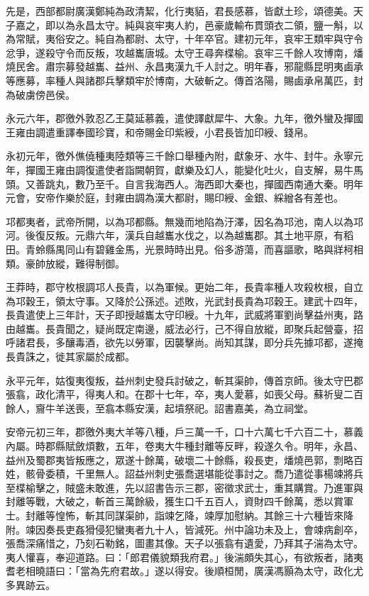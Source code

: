\begin{pinyinscope}
先是，西部都尉廣漢鄭純為政清絜，化行夷貊，君長感慕，皆獻土珍，頌德美。天子嘉之，即以為永昌太守。純與哀牢夷人約，邑豪歲輸布貫頭衣二領，鹽一斛，以為常賦，夷俗安之。純自為都尉、太守，十年卒官。建初元年，哀牢王類牢與守令忿爭，遂殺守令而反叛，攻越巂唐城。太守王尋奔楪榆。哀牢三千餘人攻博南，燔燒民舍。肅宗募發越巂、益州、永昌夷漢九千人討之。明年春，邪龍縣昆明夷鹵承等應募，率種人與諸郡兵擊類牢於博南，大破斬之。傳首洛陽，賜鹵承帛萬匹，封為破虜傍邑侯。

永元六年，郡徼外敦忍乙王莫延慕義，遣使譯獻犀牛、大象。九年，徼外蠻及撣國王雍由調遣重譯奉國珍寶，和帝賜金印紫綬，小君長皆加印綬、錢帛。

永初元年，徼外僬僥種夷陸類等三千餘口舉種內附，獻象牙、水牛、封牛。永寧元年，撣國王雍由調復遣使者詣闕朝賀，獻樂及幻人，能變化吐火，自支解，易牛馬頭。又善跳丸，數乃至千。自言我海西人。海西即大秦也，撣國西南通大秦。明年元會，安帝作樂於庭，封雍由調為漢大都尉，賜印綬、金銀、綵繒各有差也。

邛都夷者，武帝所開，以為邛都縣。無幾而地陷為汙澤，因名為邛池，南人以為邛河。後復反叛。元鼎六年，漢兵自越巂水伐之，以為越巂郡。其土地平原，有稻田。青蛉縣禺同山有碧雞金馬，光景時時出見。俗多游蕩，而喜謳歌，略與牂柯相類。豪帥放縱，難得制御。

王莽時，郡守枚根調邛人長貴，以為軍候。更始二年，長貴率種人攻殺枚根，自立為邛穀王，領太守事。又降於公孫述。述敗，光武封長貴為邛穀王。建武十四年，長貴遣使上三年計，天子即授越巂太守印綬。十九年，武威將軍劉尚擊益州夷，路由越巂。長貴聞之，疑尚既定南邊，威法必行，己不得自放縱，即聚兵起營臺，招呼諸君長，多釀毒酒，欲先以勞軍，因襲擊尚。尚知其謀，即分兵先據邛都，遂掩長貴誅之，徙其家屬於成都。

永平元年，姑復夷復叛，益州刺史發兵討破之，斬其渠帥，傳首京師。後太守巴郡張翕，政化清平，得夷人和。在郡十七年，卒，夷人愛慕，如喪父母。蘇祈叟二百餘人，齎牛羊送喪，至翕本縣安漢，起墳祭祀。詔書嘉美，為立祠堂。

安帝元初三年，郡徼外夷大羊等八種，戶三萬一千，口十六萬七千六百二十，慕義內屬。時郡縣賦斂煩數，五年，卷夷大牛種封離等反畔，殺遂久令。明年，永昌、益州及蜀郡夷皆叛應之，眾遂十餘萬，破壞二十餘縣，殺長吏，燔燒邑郭，剽略百姓，骸骨委積，千里無人。詔益州刺史張喬選堪能從事討之。喬乃遣從事楊竦將兵至楪榆擊之，賊盛未敢進，先以詔書告示三郡，密徵求武士，重其購賞。乃進軍與封離等戰，大破之，斬首三萬餘級，獲生口千五百人，資財四千餘萬，悉以賞軍士。封離等惶怖，斬其同謀渠帥，詣竦乞降，竦厚加慰納。其餘三十六種皆來降附。竦因奏長吏姦猾侵犯蠻夷者九十人，皆減死。州中論功未及上，會竦病創卒，張喬深痛惜之，乃刻石勒銘，圖畫其像。天子以張翕有遺愛，乃拜其子湍為太守。夷人懽喜，奉迎道路。曰：「郎君儀貌類我府君。」後湍頗失其心，有欲叛者，諸夷耆老相曉語曰：「當為先府君故。」遂以得安。後順桓閒，廣漢馮顥為太守，政化尤多異跡云。


\end{pinyinscope}
